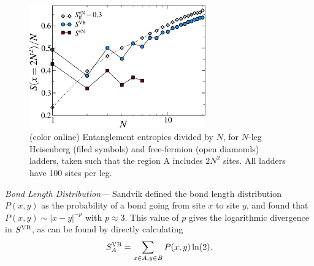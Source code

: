 \documentclass[prl,aps,twocolumn,floatfix,amsmath,amssymb,superscriptaddress,tightenlines]{revtex4}
\begin{document}

\begin{figure} { \includegraphics[width=3in]{fig4.eps} \caption{(color
online) Entanglement entropies divided by $N$,  for $N$-leg Heisenberg (filed symbols) and free-fermion (open diamonds) ladders, taken such that the region A includes $2N^2$ sites.
All ladders
have 100 sites per leg.  \label{zigzag}}} \end{figure}

{\it Bond Length Distribution---} Sandvik defined the bond length
distribution $P(x,y)$ as the probability of a bond going from site $x$ to
site $y$, and found that $P(x,y)\sim |x-y|^{-p}$ with $p\approx 3$.  
This value of $p$ gives the logarithmic divergence in $S^{\rm VB}$, as can be
found by directly calculating 
\begin{equation}
S^{\rm VB}_{A}=\sum_{x\in A,y\in B} P(x,y)\ln (2).
\end{equation}
\end{document}

